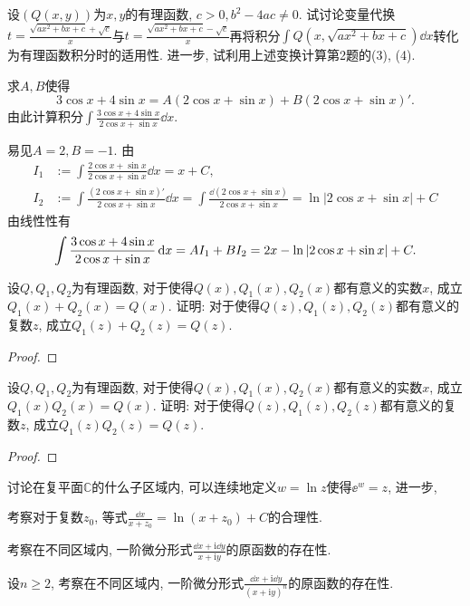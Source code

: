 \begin{quiza}
\begin{solution}
\end{solution}
\woe 设\((Q(x,y))\)为\(x,y\)的有理函数, \(c>0,b^2-4ac\ne 0\). 试讨论变量代换\(t=\frac{\sqrt{ax^2+bx+c}+\sqrt{c}}{x}\)与\(t=\frac{\sqrt{ax^2+bx+c}-\sqrt{c}}{x}\)再将积分\(\int Q(x,\sqrt{ax^2+bx+c})\dd x\)转化为有理函数积分时的适用性. 进一步, 试利用上述变换计算第2题的(3), (4).
\begin{solution}
	
\end{solution}
\woe 求\(A,B\)使得\[3\cos x+4\sin x=A(2\cos x+\sin x)+B(2\cos x+\sin x)'.\]由此计算积分\(\int\frac{3\cos x+4\sin x}{2\cos x+\sin x}\dd x.\)
\begin{solution}
易见\(A=2,B=-1\). 由\[\begin{split}
I_1&:=\int\frac{2\cos x+\sin x}{2\cos x+\sin x}\dd x=x+C,\\
I_2&:=\int\frac{(2\cos x+\sin x)'}{2\cos x+\sin x}\dd x=\int\frac{\dd\left(2\cos x+\sin x\right)}{2\cos x+\sin x}=\ln\left|2\cos x+\sin x\right|+C
\end{split}\]由线性性有\[\int\frac{3\cos x+4\sin x}{2\cos x+\sin x}\,\mathrm{d} x=AI_1+BI_2=2x-\ln\left|2\cos x+\sin x\right|+C.\qedhere\]
\end{solution}
\end{quiza}
\begin{quizb}
\woe 设\(Q,Q_1,Q_2\)为有理函数, 对于使得\(Q(x),Q_1(x),Q_2(x)\)都有意义的实数\(x\), 成立\(Q_1(x)+Q_2(x)=Q(x)\). 证明: 对于使得\(Q(z),Q_1(z),Q_2(z)\)都有意义的复数\(z\), 成立\(Q_1(z)+Q_2(z)=Q(z)\).
\begin{proof}

\end{proof}
\woe 设\(Q,Q_1,Q_2\)为有理函数, 对于使得\(Q(x),Q_1(x),Q_2(x)\)都有意义的实数\(x\), 成立\(Q_1(x)Q_2(x)=Q(x)\). 证明: 对于使得\(Q(z),Q_1(z),Q_2(z)\)都有意义的复数\(z\), 成立\(Q_1(z)Q_2(z)=Q(z)\).
\begin{proof}

\end{proof}
\woe 讨论在复平面\(\mathbb{C}\)的什么子区域内, 可以连续地定义\(w=\ln z\)使得\(\ee^w=z\), 进一步,
\begin{quizs}
\item 考察对于复数\(z_0\), 等式\(\frac{\dd x}{x+z_0}=\ln (x+z_0)+C\)的合理性.
\item 考察在不同区域内, 一阶微分形式\(\frac{\dd x+\mathrm{i}\dd y}{x+\mathrm{i}y}\)的原函数的存在性.
\item 设\(n\geqslant 2\), 考察在不同区域内, 一阶微分形式\(\frac{\dd x+\mathrm{i}\dd y}{(x+\mathrm{i}y)^n}\)的原函数的存在性.
\end{quizs}
\end{quizb}
